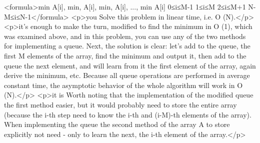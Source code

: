 <formula>min A[i], min, A[i], min, A[i], ..., min A[i]
0≤i≤M-1 1≤i≤M 2≤i≤M+1 N-M≤i≤N-1</formula>
<p>you Solve this problem in linear time, i.e. O (N).</p>
<p>it's enough to make the turn, modified to find the minimum in O (1), which was examined above, and in this problem, you can use any of the two methods for implementing a queue. Next, the solution is clear: let's add to the queue, the first M elements of the array, find the minimum and output it, then add to the queue the next element, and will learn from it the first element of the array, again derive the minimum, etc. Because all queue operations are performed in average constant time, the asymptotic behavior of the whole algorithm will work in O (N).</p>
<p>it is Worth noting that the implementation of the modified queue the first method easier, but it would probably need to store the entire array (because the i-th step need to know the i-th and (i-M)-th elements of the array). When implementing the queue the second method of the array A to store explicitly not need - only to learn the next, the i-th element of the array.</p>